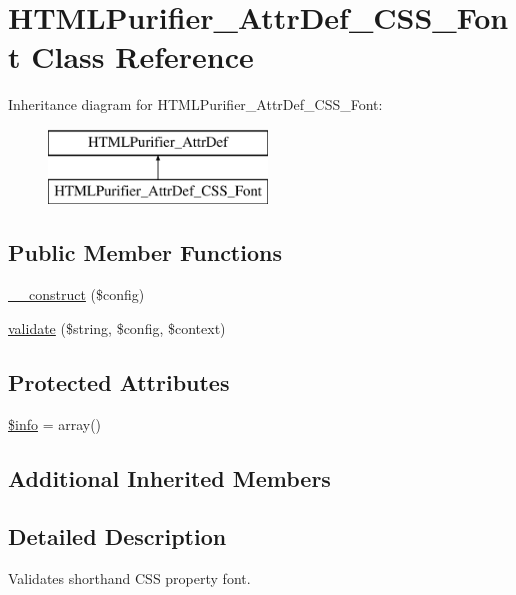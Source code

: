 \hypertarget{classHTMLPurifier__AttrDef__CSS__Font}{\section{H\+T\+M\+L\+Purifier\+\_\+\+Attr\+Def\+\_\+\+C\+S\+S\+\_\+\+Font Class Reference}
\label{classHTMLPurifier__AttrDef__CSS__Font}
}
Inheritance diagram for H\+T\+M\+L\+Purifier\+\_\+\+Attr\+Def\+\_\+\+C\+S\+S\+\_\+\+Font\+:\begin{figure}[H]
\begin{center}
\leavevmode
\includegraphics[height=2.000000cm]{classHTMLPurifier__AttrDef__CSS__Font}
\end{center}
\end{figure}
\subsection*{Public Member Functions}
\begin{DoxyCompactItemize}
\item 
\hyperlink{classHTMLPurifier__AttrDef__CSS__Font_aa55f2a88733e1958baf14f8aa2a0e1b4}{\+\_\+\+\_\+construct} (\$config)
\item 
\hyperlink{classHTMLPurifier__AttrDef__CSS__Font_a8fbc1f20fd2dabc9c5b5a59338e647ac}{validate} (\$string, \$config, \$context)
\end{DoxyCompactItemize}
\subsection*{Protected Attributes}
\begin{DoxyCompactItemize}
\item 
\hyperlink{classHTMLPurifier__AttrDef__CSS__Font_a18be00fdfbebb2803a53d1590569f05e}{\$info} = array()
\end{DoxyCompactItemize}
\subsection*{Additional Inherited Members}


\subsection{Detailed Description}
Validates shorthand C\+S\+S property font. 

